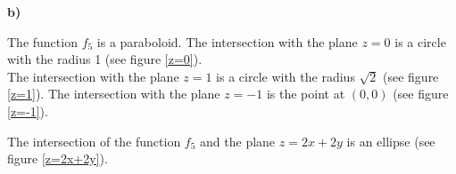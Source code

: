 {\textbf{b)}
\begin{iii}
\item The function $f_5$ is a paraboloid. The intersection with the plane $z = 0$ is a circle with the radius 1 (see figure \ref{z=0}).\\
The intersection with the plane $z = 1$ is a circle with the radius $\sqrt{2}$ (see figure \ref{z=1}). 
The intersection with the plane $z = -1$ is the point at $(0,0)$ (see figure \ref{z=-1}). 
\item The intersection of the function $f_5$ and the plane $z =2x+2y$ is an ellipse (see figure \ref{z=2x+2y}).
\end{iii}
%
%
%


}

